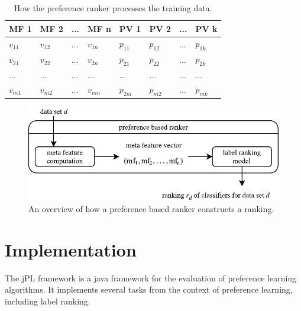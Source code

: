 \begin{table}[h]
\centering
	\begin{tabularx}{\textwidth}{X | X | X | X | X | X | X | X}
		MF 1				& MF 2				& ... 	& MF n				& PV 1 		& PV 2 		&	...	&	PV k 		\\ \hline
		$v_{11}$			& $v_{12}$			& ...	& $v_{1n}$			& $p_{11}$	& $p_{12}$	& 	...	&	$p_{1k}$		\\ 
		$v_{21}$			& $v_{22}$			& ...	& $v_{2n}$			& $p_{21}$	& $p_{22}$	& 	...	&	$p_{2k}$		\\
		...				& ...				& ...	& ...				& ...		& ...		&	...	&	...			\\
		$v_{m1}$			& $v_{m2}$			& ... 	& $v_{mn}$			& $p_{2m}$	& $p_{m2}$	& 	...	&	$p_{mk}$			 
	\end{tabularx}
	\label{tab:preferenceTable}
	\caption{How the preference ranker processes the training data.}
\end{table}

\begin{figure}
\centering
\includegraphics[scale=1]{gfx/label_ranking_model.pdf}
\caption{An overview of how a preference based ranker constructs a ranking.}
\label{fig:preference_ranker_model}
\end{figure}

\section{Implementation}

The jPL framework is a java framework for the evaluation of preference learning algorithms. It implements several tasks from the context of preference learning, including label ranking. 

